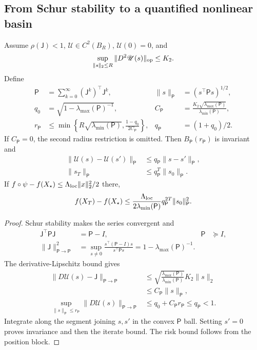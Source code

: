 \subsection{From Schur stability to a quantified nonlinear basin}
\begin{theorem}
\label{thm:local-nonlinear-basin}
Assume $\rho(\mathsf J)<1$, $\mathscr U\in C^2(B_R)$,
$\mathscr U(0)=0$, and
\begin{equation}
\sup_{\|s\|_2\leq R}\|D^2\mathscr U(s)\|_{\rm op}\leq K_2 .
\end{equation}
Define
\begin{align}
\mathsf P&=\sum_{k=0}^\infty(\mathsf J^k)^\top\mathsf J^k,&
\|s\|_{\mathsf P}&=(s^\top\mathsf Ps)^{1/2},\\
q_0&=\sqrt{1-\lambda_{\max}(\mathsf P)^{-1}},&
C_{\mathsf P}&=\frac{K_2\sqrt{\lambda_{\max}(\mathsf P)}}
{\lambda_{\min}(\mathsf P)},\\
r_{\mathsf P}
&\leq\min\left\{R\sqrt{\lambda_{\min}(\mathsf P)},
\frac{1-q_0}{2C_{\mathsf P}}\right\},&
q_{\mathsf P}&=(1+q_0)/2 .
\label{eq:local-certified-radius}
\end{align}
If $C_{\mathsf P}=0$, the second radius restriction is omitted.
Then $B_{\mathsf P}(r_{\mathsf P})$ is invariant and
\begin{align}
\|\mathscr U(s)-\mathscr U(s')\|_{\mathsf P}
&\leq q_{\mathsf P}\|s-s'\|_{\mathsf P},\\
\|s_T\|_{\mathsf P}
&\leq q_{\mathsf P}^T\|s_0\|_{\mathsf P}.
\label{eq:local-nonlinear-contraction}
\end{align}
If $f\circ\psi-f(X_\star)\leq\Lambda_{\rm loc}\|x\|_2^2/2$ there,
\begin{equation}
f(X_T)-f(X_\star)
\leq\frac{\Lambda_{\rm loc}}
{2\lambda_{\min}(\mathsf P)}
q_{\mathsf P}^{2T}\|s_0\|_{\mathsf P}^2 .
\end{equation}
\end{theorem}
\begin{proof}
Schur stability makes the series convergent and
\begin{align}
\mathsf J^\top\mathsf P\mathsf J&=\mathsf P-I,&
\mathsf P&\succeq I,\\
\|\mathsf J\|_{\mathsf P\to\mathsf P}^2
&=\sup_{s\ne0}
\frac{s^\top(\mathsf P-I)s}{s^\top\mathsf Ps}
=1-\lambda_{\max}(\mathsf P)^{-1}.
\end{align}
The derivative-Lipschitz bound gives
\begin{align}
\|D\mathscr U(s)-\mathsf J\|_{\mathsf P\to\mathsf P}
&\leq\sqrt{\frac{\lambda_{\max}(\mathsf P)}
{\lambda_{\min}(\mathsf P)}}K_2\|s\|_2\\
&\leq C_{\mathsf P}\|s\|_{\mathsf P},\\
\sup_{\|s\|_{\mathsf P}\leq r_{\mathsf P}}
\|D\mathscr U(s)\|_{\mathsf P\to\mathsf P}
&\leq q_0+C_{\mathsf P}r_{\mathsf P}
\leq q_{\mathsf P}<1 .
\end{align}
Integrate along the segment joining $s,s'$ in the convex
$\mathsf P$ ball. Setting $s'=0$ proves invariance and then the
iterate bound. The risk bound follows from the position block.
\end{proof}

